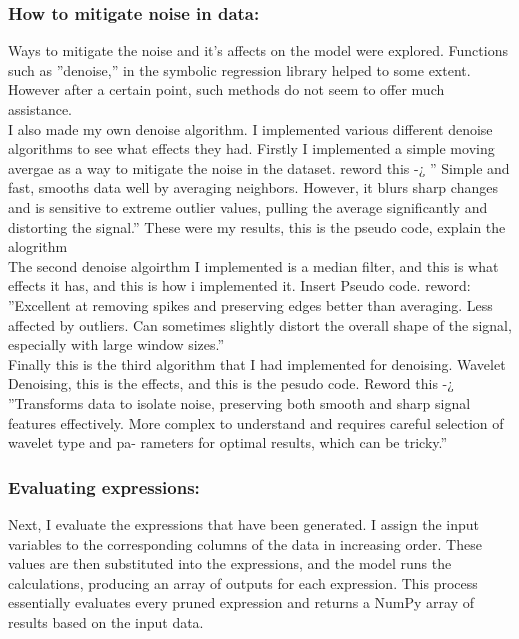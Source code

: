 \documentclass{article}
\begin{document}
\subsubsection{How to mitigate noise in data: }

Ways to mitigate the noise and it’s affects on the model were explored. Functions such as ”denoise,” in the
symbolic regression library helped to some extent. However after a certain point, such methods do not seem to
offer much assistance.\\
I also made my own denoise algorithm. I implemented various different denoise algorithms to see what effects
they had. Firstly I implemented a simple moving avergae as a way to mitigate the noise in the dataset. reword
this -¿ ” Simple and fast, smooths data well by averaging neighbors. However, it blurs sharp changes and is
sensitive to extreme outlier values, pulling the average significantly and distorting the signal.”
These were my results, this is the pseudo code, explain the alogrithm\\

The second denoise algoirthm I implemented is a median filter, and this is what effects it has, and this is how
i implemented it. Insert Pseudo code. reword: ”Excellent at removing spikes and preserving edges better than
averaging. Less affected by outliers. Can sometimes slightly distort the overall shape of the signal, especially
with large window sizes.”\\

Finally this is the third algorithm that I had implemented for denoising. Wavelet Denoising, this is the effects,
and this is the pesudo code. Reword this -¿ ”Transforms data to isolate noise, preserving both smooth and sharp
signal features effectively. More complex to understand and requires careful selection of wavelet type and pa-
rameters for optimal results, which can be tricky.”\\





\subsubsection{Evaluating expressions:}


Next, I evaluate the expressions that have been generated. I assign the input variables to the corresponding columns of the data in increasing order. These values are then substituted into the expressions, and the model runs the calculations, producing an array of outputs for each expression. This process essentially evaluates every pruned expression and returns a NumPy array of results based on the input data.\\
\end{document}
